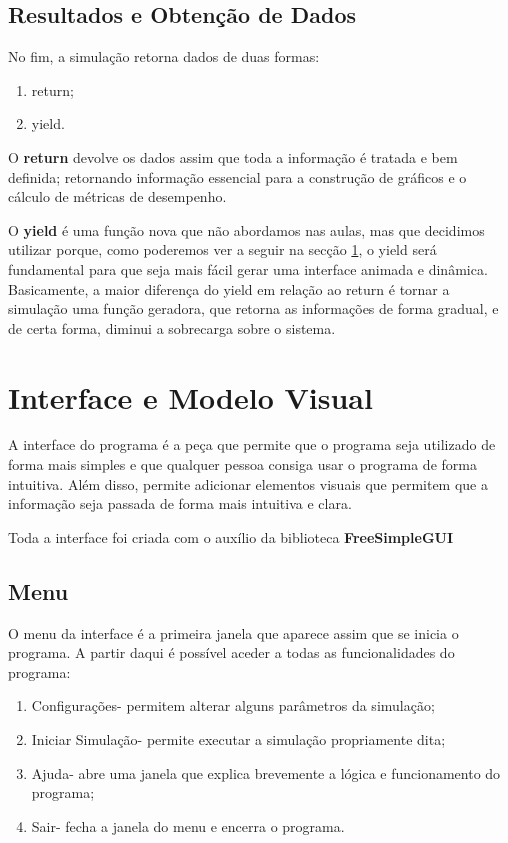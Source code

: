 \documentclass[12pt,a4paper]{article} %
\begin{document}
    \medskip
    \subsection{Resultados e Obtenção de Dados}

    No fim, a simulação retorna dados de duas formas:
    \begin{enumerate}
        \item return;
        \item yield.
    \end{enumerate}

    O \textbf{return} devolve os dados assim que toda a informação é tratada e bem definida; retornando informação essencial para a construção de gráficos e o cálculo de métricas de desempenho.

    \medskip
    O \textbf{yield} é uma função nova que não abordamos nas aulas, mas que decidimos utilizar porque, como poderemos ver a seguir na secção   \ref{sec:Interface}, o yield será fundamental para que seja mais fácil gerar uma interface animada e dinâmica. Basicamente, a maior diferença do yield em relação ao return é tornar a simulação uma função geradora, que retorna as informações de forma gradual, e de certa forma, diminui a sobrecarga sobre o sistema.

    \newpage
    \section{Interface e Modelo Visual}
    \label{sec:Interface}

    A interface do programa é a peça que permite que o programa seja utilizado de forma mais simples e que qualquer pessoa consiga usar o programa de forma intuitiva. Além disso, permite adicionar elementos visuais que permitem que a informação seja passada de forma mais intuitiva e clara.

    Toda a interface foi criada com o auxílio da biblioteca \textbf{FreeSimpleGUI}

    \subsection{Menu}

    O menu da interface é a primeira janela que aparece assim que se inicia o programa. A partir daqui é possível aceder a todas as funcionalidades do programa:
    \begin{enumerate}
        \item Configurações- permitem alterar alguns parâmetros da simulação;
        \item Iniciar Simulação- permite executar a simulação propriamente dita;
        \item Ajuda- abre uma janela que explica brevemente a lógica e funcionamento do programa;
        \item Sair- fecha a janela do menu e encerra o programa.
    \end{enumerate}
\end{document}
